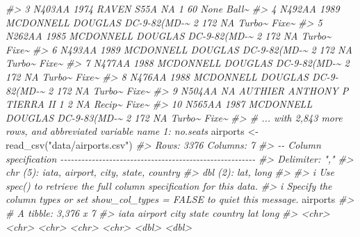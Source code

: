 \documentclass[
]{book}
\newenvironment{Shaded}{\begin{snugshade}}{\end{snugshade}}
\newcommand{\CommentTok}[1]{\textcolor[rgb]{0.56,0.35,0.01}{\textit{#1}}}
\newcommand{\FunctionTok}[1]{\textcolor[rgb]{0.00,0.00,0.00}{#1}}
\newcommand{\NormalTok}[1]{#1}
\newcommand{\OtherTok}[1]{\textcolor[rgb]{0.56,0.35,0.01}{#1}}
\newcommand{\StringTok}[1]{\textcolor[rgb]{0.31,0.60,0.02}{#1}}
\begin{document}
\begin{Shaded}
\begin{Highlighting}[]
\CommentTok{\#\textgreater{}  3 N403AA  1974 RAVEN             S55A             NA       1    60 None   Ball\textasciitilde{}}
\CommentTok{\#\textgreater{}  4 N492AA  1989 MCDONNELL DOUGLAS DC{-}9{-}82(MD{-}\textasciitilde{}      2     172    NA Turbo\textasciitilde{} Fixe\textasciitilde{}}
\CommentTok{\#\textgreater{}  5 N262AA  1985 MCDONNELL DOUGLAS DC{-}9{-}82(MD{-}\textasciitilde{}      2     172    NA Turbo\textasciitilde{} Fixe\textasciitilde{}}
\CommentTok{\#\textgreater{}  6 N493AA  1989 MCDONNELL DOUGLAS DC{-}9{-}82(MD{-}\textasciitilde{}      2     172    NA Turbo\textasciitilde{} Fixe\textasciitilde{}}
\CommentTok{\#\textgreater{}  7 N477AA  1988 MCDONNELL DOUGLAS DC{-}9{-}82(MD{-}\textasciitilde{}      2     172    NA Turbo\textasciitilde{} Fixe\textasciitilde{}}
\CommentTok{\#\textgreater{}  8 N476AA  1988 MCDONNELL DOUGLAS DC{-}9{-}82(MD{-}\textasciitilde{}      2     172    NA Turbo\textasciitilde{} Fixe\textasciitilde{}}
\CommentTok{\#\textgreater{}  9 N504AA    NA AUTHIER ANTHONY P TIERRA II         1       2    NA Recip\textasciitilde{} Fixe\textasciitilde{}}
\CommentTok{\#\textgreater{} 10 N565AA  1987 MCDONNELL DOUGLAS DC{-}9{-}83(MD{-}\textasciitilde{}      2     172    NA Turbo\textasciitilde{} Fixe\textasciitilde{}}
\CommentTok{\#\textgreater{} \# ... with 2,843 more rows, and abbreviated variable name 1: no.seats}
\NormalTok{airports }\OtherTok{\textless{}{-}} \FunctionTok{read\_csv}\NormalTok{(}\StringTok{"data/airports.csv"}\NormalTok{)}
\CommentTok{\#\textgreater{} Rows: 3376 Columns: 7}
\CommentTok{\#\textgreater{} {-}{-} Column specification {-}{-}{-}{-}{-}{-}{-}{-}{-}{-}{-}{-}{-}{-}{-}{-}{-}{-}{-}{-}{-}{-}{-}{-}{-}{-}{-}{-}{-}{-}{-}{-}{-}{-}{-}{-}{-}{-}{-}{-}{-}{-}{-}{-}{-}{-}{-}{-}{-}{-}{-}{-}{-}{-}{-}{-}}
\CommentTok{\#\textgreater{} Delimiter: ","}
\CommentTok{\#\textgreater{} chr (5): iata, airport, city, state, country}
\CommentTok{\#\textgreater{} dbl (2): lat, long}
\CommentTok{\#\textgreater{} }
\CommentTok{\#\textgreater{} i Use \textasciigrave{}spec()\textasciigrave{} to retrieve the full column specification for this data.}
\CommentTok{\#\textgreater{} i Specify the column types or set \textasciigrave{}show\_col\_types = FALSE\textasciigrave{} to quiet this message.}
\NormalTok{airports}
\CommentTok{\#\textgreater{} \# A tibble: 3,376 x 7}
\CommentTok{\#\textgreater{}    iata  airport              city             state country   lat   long}
\CommentTok{\#\textgreater{}    \textless{}chr\textgreater{} \textless{}chr\textgreater{}                \textless{}chr\textgreater{}            \textless{}chr\textgreater{} \textless{}chr\textgreater{}   \textless{}dbl\textgreater{}  \textless{}dbl\textgreater{}}

\end{Highlighting}
\end{Shaded}
\end{document}
